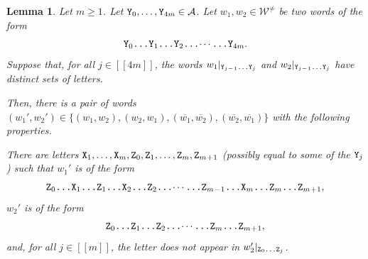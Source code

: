 \documentclass[11pt]{amsart}
\newtheorem{lemma}[theorem]{Lemma}
\theoremstyle{definition}
\renewcommand{\geq}{\geqslant}
\newcommand{\sinterval}[1]{[\![#1]\!] }
\newcommand{\upletters}[1]{{\normalfont{\texttt{#1}}}}
\newcommand{\makesubscript}[1]{\textsubscript{$#1$}}
\newcommand{\word}{\mathcal{W}}
\begin{document}
\begin{lemma}
\label{lem:unpredstep3}
Let $m\geq 1$. Let $\upletters{Y\makesubscript{0}}, \ldots, \upletters{Y\makesubscript{4m}}\in \mathcal{A}$. Let $w_1, w_2\in \word^{\neq}$ be two words of the form
\begin{equation*}
\upletters{Y\makesubscript{0}\ldots Y\makesubscript{1}\ldots Y\makesubscript{2}\ldots$\cdots$\ldots Y\makesubscript{4m}}.
\end{equation*}
Suppose that, for all $j\in \sinterval{4m}$, the words $w_1|_{\upletters{Y\makesubscript{j\!-\!1}\ldots Y\makesubscript{j}}}$ and $w_2|_{\upletters{Y\makesubscript{j\!-\!1}\ldots Y\makesubscript{j}}}$ have distinct sets of letters.

Then, there is a pair of words $(w_1', w_2') \in \{(w_1, w_2), (w_2, w_1), (\overline{w_1}, \overline{w_2}), (\overline{w_2}, \overline{w_1})\}$ with the following properties.

There are letters $\upletters{X\makesubscript{1}},\ldots,\upletters{X\makesubscript{m}},\upletters{Z\makesubscript{0}},\upletters{Z\makesubscript{1}},\ldots,\upletters{Z\makesubscript{m}},\upletters{Z\makesubscript{m\!+\!1}}$ (possibly equal to some of the $\upletters{Y\makesubscript{j}}$) such that $w_1'$ is of the form 
\begin{equation*}
\upletters{Z\makesubscript{0}\ldots X\makesubscript{1}\ldots Z\makesubscript{1}\ldots X\makesubscript{2}\ldots Z\makesubscript{2}\ldots$\cdots$\ldots Z\makesubscript{m\!-\!1}\ldots X\makesubscript{m}\ldots Z\makesubscript{m}\ldots Z\makesubscript{m\!+\!1}},
\end{equation*}
$w_2'$ is of the form 
\begin{equation*}
\upletters{Z\makesubscript{0}\ldots Z\makesubscript{1}\ldots Z\makesubscript{2}\ldots$\cdots$\ldots Z\makesubscript{m}\ldots Z\makesubscript{m\!+\!1}},
\end{equation*}
and, for all $j\in \sinterval{m}$, the letter \upletters{X\makesubscript{j}} does not appear in $w_2'|_{\upletters{Z\makesubscript{0}\ldots Z\makesubscript{j}}}$.
\end{lemma}
\end{document}
